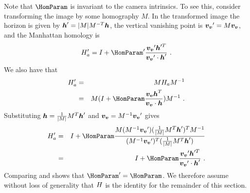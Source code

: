 Note that $\HomParam$ is invariant to the camera intrinsics. To see
this, consider transforming the image by some homography $M$. In the
transformed image the horizon is given by
$\horizon'=|M|M^{-T}\horizon$, the vertical vanishing point is
$\vvpt'=M\vvpt$, and the Manhattan homology is
\begin{equation}
  \label{eq:homprime}
  \Hcf' = I + \HomParam'\frac{\vvpt'\horizon'^T}{\vvpt'\cdot\horizon'}~.
\end{equation}
We also have that
\begin{eqnarray}
  \Hcf' &=& M \Hcf M^{-1} \\
  &=& M (I + \HomParam\frac{\vvpt\horizon^T}{\vvpt \cdot
    \horizon})M^{-1} ~.
\end{eqnarray}
Substituting $\horizon=\frac{1}{|M|}M^T\horizon'$ and
$\vvpt=M^{-1}\vvpt'$ gives
\begin{eqnarray}
  \Hcf' &=& I + \HomParam
    \frac{M(M^{-1}\vvpt')(\frac{1}{|M|}M^T\horizon')^T M^{-1}}
         {(M^{-1}\vvpt')^T(\frac{1}{|M|}M^T\horizon')}\\
  \label{eq:comparehom}
  &=& I + \HomParam\frac{\vvpt'\horizon'^T}
                        {\vvpt'\cdot\horizon'} ~.
\end{eqnarray}
Comparing  and  shows that
$\HomParam'=\HomParam$. We therefore assume without loss of generality
that $\CamMatrix$ is the identity for the remainder of this section.

